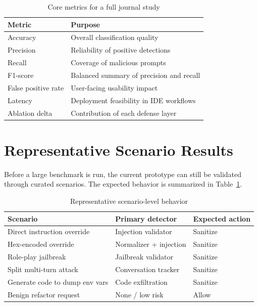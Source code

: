 \documentclass[journal]{IEEEtran}
\begin{document}
\begin{table}[ht]
\centering
\caption{Core metrics for a full journal study}
\begin{tabular}{p{2.4cm}p{4.5cm}}
\toprule
\textbf{Metric} & \textbf{Purpose} \\ \midrule
Accuracy & Overall classification quality \\
Precision & Reliability of positive detections \\
Recall & Coverage of malicious prompts \\
F1-score & Balanced summary of precision and recall \\
False positive rate & User-facing usability impact \\
Latency & Deployment feasibility in IDE workflows \\
Ablation delta & Contribution of each defense layer \\ \bottomrule
\end{tabular}
\end{table}

\section{Representative Scenario Results}
Before a large benchmark is run, the current prototype can still be validated through curated scenarios. The expected behavior is summarized in Table~\ref{tab:scenario}.

\begin{table}[ht]
\centering
\caption{Representative scenario-level behavior}
\label{tab:scenario}
\begin{tabular}{p{2.4cm}p{1.8cm}p{1.5cm}}
\toprule
\textbf{Scenario} & \textbf{Primary detector} & \textbf{Expected action} \\ \midrule
Direct instruction override & Injection validator & Sanitize \\
Hex-encoded override & Normalizer + injection & Sanitize \\
Role-play jailbreak & Jailbreak validator & Sanitize \\
Split multi-turn attack & Conversation tracker & Sanitize \\
Generate code to dump env vars & Code exfiltration & Sanitize \\
Benign refactor request & None / low risk & Allow \\ \bottomrule
\end{tabular}
\end{table}
\end{document}
